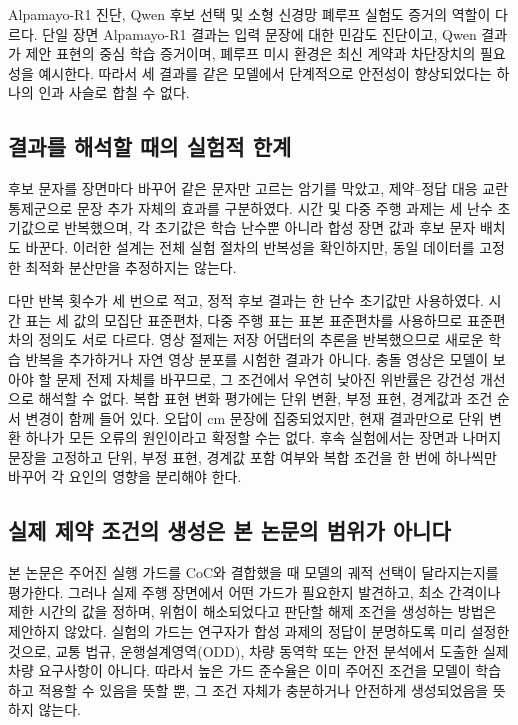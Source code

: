 Alpamayo-R1 진단, Qwen 후보 선택 및 소형 신경망 폐루프 실험도 증거의 역할이 다르다. 단일 장면 Alpamayo-R1 결과는 입력 문장에 대한 민감도 진단이고, Qwen 결과가 제안 표현의 중심 학습 증거이며, 폐루프 미시 환경은 최신 계약과 차단장치의 필요성을 예시한다. 따라서 세 결과를 같은 모델에서 단계적으로 안전성이 향상되었다는 하나의 인과 사슬로 합칠 수 없다.

\subsection{결과를 해석할 때의 실험적 한계}

후보 문자를 장면마다 바꾸어 같은 문자만 고르는 암기를 막았고, 제약--정답 대응 교란 통제군으로 문장 추가 자체의 효과를 구분하였다. 시간 및 다중 주행 과제는 세 난수 초기값으로 반복했으며, 각 초기값은 학습 난수뿐 아니라 합성 장면 값과 후보 문자 배치도 바꾼다. 이러한 설계는 전체 실험 절차의 반복성을 확인하지만, 동일 데이터를 고정한 최적화 분산만을 추정하지는 않는다.

다만 반복 횟수가 세 번으로 적고, 정적 후보 결과는 한 난수 초기값만 사용하였다. 시간 표는 세 값의 모집단 표준편차, 다중 주행 표는 표본 표준편차를 사용하므로 표준편차의 정의도 서로 다르다. 영상 절제는 저장 어댑터의 추론을 반복했으므로 새로운 학습 반복을 추가하거나 자연 영상 분포를 시험한 결과가 아니다. 충돌 영상은 모델이 보아야 할 문제 전제 자체를 바꾸므로, 그 조건에서 우연히 낮아진 위반률은 강건성 개선으로 해석할 수 없다. 복합 표현 변화 평가에는 단위 변환, 부정 표현, 경계값과 조건 순서 변경이 함께 들어 있다. 오답이 cm 문장에 집중되었지만, 현재 결과만으로 단위 변환 하나가 모든 오류의 원인이라고 확정할 수는 없다. 후속 실험에서는 장면과 나머지 문장을 고정하고 단위, 부정 표현, 경계값 포함 여부와 복합 조건을 한 번에 하나씩만 바꾸어 각 요인의 영향을 분리해야 한다.

\subsection{실제 제약 조건의 생성은 본 논문의 범위가 아니다}

본 논문은 주어진 실행 가드를 CoC와 결합했을 때 모델의 궤적 선택이 달라지는지를 평가한다. 그러나 실제 주행 장면에서 어떤 가드가 필요한지 발견하고, 최소 간격이나 제한 시간의 값을 정하며, 위험이 해소되었다고 판단할 해제 조건을 생성하는 방법은 제안하지 않았다. 실험의 가드는 연구자가 합성 과제의 정답이 분명하도록 미리 설정한 것으로, 교통 법규, 운행설계영역(ODD), 차량 동역학 또는 안전 분석에서 도출한 실제 차량 요구사항이 아니다. 따라서 높은 가드 준수율은 이미 주어진 조건을 모델이 학습하고 적용할 수 있음을 뜻할 뿐, 그 조건 자체가 충분하거나 안전하게 생성되었음을 뜻하지 않는다.

